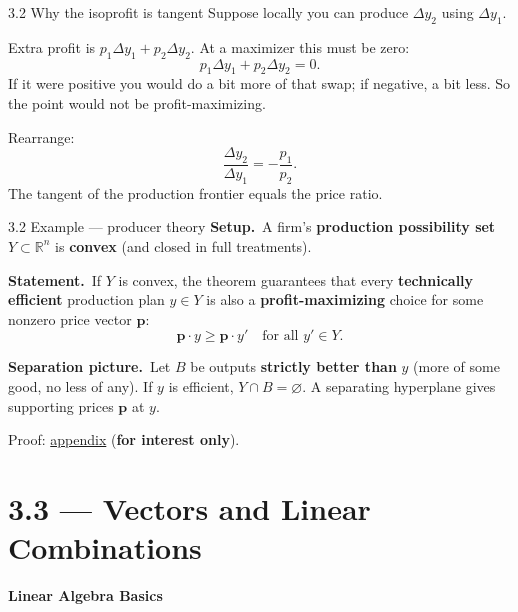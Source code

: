 \documentclass[11pt,aspectratio=169]{beamer}
\newcommand{\InterestOnly}{\textcolor{mAccent}{\textbf{for interest only}}}
\newcommand{\AppendixLink}[1]{%
  \hyperlink{#1}{\textcolor{mAccent}{appendix}}}
\begin{document}
\begin{frame}{3.2 Why the isoprofit is tangent}
  \footnotesize
  Suppose locally you can produce $\Delta y_2$ using $\Delta y_1$.

  \medskip
  Extra profit is $p_1\Delta y_1+p_2\Delta y_2$.
  At a maximizer this must be zero:
  \[
    p_1\Delta y_1+p_2\Delta y_2=0.
  \]
  If it were positive you would do a bit more of that swap; if negative, a bit less.
  So the point would not be profit-maximizing.

  \medskip
  Rearrange:
  \[
    \frac{\Delta y_2}{\Delta y_1}=-\frac{p_1}{p_2}.
  \]
  The tangent of the production frontier equals the price ratio.
\end{frame}

\begin{frame}{3.2 Example --- producer theory}
  \footnotesize
  \textbf{Setup.}\ A firm's \textbf{production possibility set} $Y\subset\mathbb{R}^n$ is
  \textbf{convex} (and closed in full treatments).

  \medskip
  \textbf{Statement.}\ If $Y$ is convex, the theorem guarantees that every
  \textbf{technically efficient} production plan $y\in Y$ is also a
  \textbf{profit-maximizing} choice for some nonzero price vector $\mathbf{p}$:
  \[
    \mathbf{p}\cdot y \ge \mathbf{p}\cdot y'
    \quad\text{for all }y'\in Y.
  \]

  \medskip
  \textbf{Separation picture.}\ Let $B$ be outputs \textbf{strictly better than} $y$
  (more of some good, no less of any). If $y$ is efficient, $Y\cap B=\varnothing$.
  A separating hyperplane gives supporting prices $\mathbf{p}$ at $y$.

  \medskip
  {\scriptsize Proof: \AppendixLink{sec:producer-proof} (\InterestOnly).}
\end{frame}

\section{3.3 --- Vectors and Linear Combinations}

\begin{frame}[plain]
  \vfill
  \begin{center}
    {\LARGE\bfseries Linear Algebra Basics}
  \end{center}
  \vfill
\end{frame}
\end{document}

